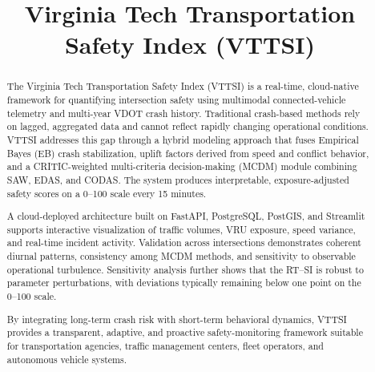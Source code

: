 \documentclass[conference]{IEEEtran}
\begin{document}
\title{Virginia Tech Transportation Safety Index (VTTSI)}

%
%
\author{
\and
{}
}

\maketitle

\sloppy
\raggedbottom

\begin{abstract}
The Virginia Tech Transportation Safety Index (VTTSI) is a real-time, cloud-native
framework for quantifying intersection safety using multimodal connected-vehicle
telemetry and multi-year VDOT crash history. Traditional crash-based methods rely on
lagged, aggregated data and cannot reflect rapidly changing operational conditions.
VTTSI addresses this gap through a hybrid modeling approach that fuses Empirical Bayes
(EB) crash stabilization, uplift factors derived from speed and conflict behavior, and a
CRITIC-weighted multi-criteria decision-making (MCDM) module combining SAW, EDAS, and
CODAS. The system produces interpretable, exposure-adjusted safety scores on a 0--100
scale every 15 minutes.

A cloud-deployed architecture built on FastAPI, PostgreSQL, PostGIS, and Streamlit
supports interactive visualization of traffic volumes, VRU exposure, speed variance, and
real-time incident activity. Validation across intersections demonstrates coherent
diurnal patterns, consistency among MCDM methods, and sensitivity to observable
operational turbulence. Sensitivity analysis further shows that the RT--SI is robust to
parameter perturbations, with deviations typically remaining below one point on the
0--100 scale.

By integrating long-term crash risk with short-term behavioral dynamics, VTTSI provides a
transparent, adaptive, and proactive safety-monitoring framework suitable for
transportation agencies, traffic management centers, fleet operators, and autonomous
vehicle systems.%
\end{abstract}
\end{document}
